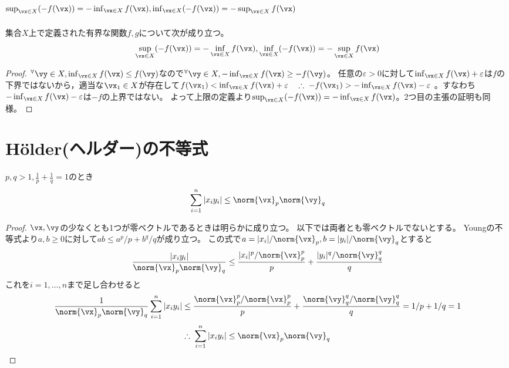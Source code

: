     \section{\texorpdfstring{$\sup_{\vx\in X}(-f(\vx)) = -\inf_{\vx\in X}f(\vx), \inf_{\vx\in X}(-f(\vx)) = -\sup_{\vx\in X}f(\vx)$}{sup\_\{x∈X\} -f(x) = -inf\_\{x∈X\}f(x), inf\_\{x∈X\} -f(x) = -sup\_\{x∈X\}f(x)}}
        \begin{shadebox}
            集合$X$上で定義された有界な関数$f,g$について次が成り立つ。
            \[ \sup_{\vx\in X}(-f(\vx)) = -\inf_{\vx\in X}f(\vx), \inf_{\vx\in X}(-f(\vx)) = -\sup_{\vx\in X}f(\vx) \]
        \end{shadebox}
        \begin{proof}
            $^\forall\vy\in X,\inf_{\vx\in X}f(\vx) \leq f(\vy)$なので$^\forall\vy\in X,-\inf_{\vx\in X}f(\vx) \geq -f(\vy)$。
            任意の$\varepsilon>0$に対して$\inf_{\vx\in X}f(\vx) + \varepsilon$は$f$の下界ではないから，適当な$\vx_1\in X$が存在して$f(\vx_1) < \inf_{\vx\in X}f(\vx) + \varepsilon \quad \therefore\; -f(\vx_1) > -\inf_{\vx\in X}f(\vx) - \varepsilon$
            。すなわち$-\inf_{\vx\in X}f(\vx) - \varepsilon$は$-f$の上界ではない。
            よって上限の定義より$\sup_{\vx\in X}(-f(\vx)) = -\inf_{\vx\in X}f(\vx)$。2つ目の主張の証明も同様。
        \end{proof}
    \section{H\"older(ヘルダー)の不等式}
        \begin{shadebox}
            $p,q>1,\frac{1}{p}+\frac{1}{q}=1$のとき
            \[\sum_{i=1}^n|x_iy_i|\leq\norm{\vx}_p\norm{\vy}_q\]
        \end{shadebox}
        \begin{proof}
            $\vx,\vy$の少なくとも1つが零ベクトルであるときは明らかに成り立つ。
            以下では両者とも零ベクトルでないとする。
            Youngの不等式より$a,b\geq 0$に対して$ab \leq a^p/p + b^q/q$が成り立つ。
            この式で$a=|x_i|/\norm{\vx}_p,b=|y_i|/\norm{\vy}_q$とすると
            \[\frac{|x_iy_i|}{\norm{\vx}_p\norm{\vy}_q}\leq\frac{|x_i|^p/\norm{\vx}_p^p}{p}+\frac{|y_i|^q/\norm{\vy}_q^q}{q}\]
            これを$i=1,\dots,n$まで足し合わせると
            \[\frac{1}{\norm{\vx}_p\norm{\vy}_q}\sum_{i=1}^n{|x_iy_i|} \leq \frac{\norm{\vx}_p^p/\norm{\vx}_p^p}{p}+\frac{\norm{\vy}_q^q/\norm{\vy}_q^q}{q} = 1/p+1/q = 1\]
            \[\therefore\;\sum_{i=1}^n|x_iy_i|\leq\norm{\vx}_p\norm{\vy}_q\]
        \end{proof}
